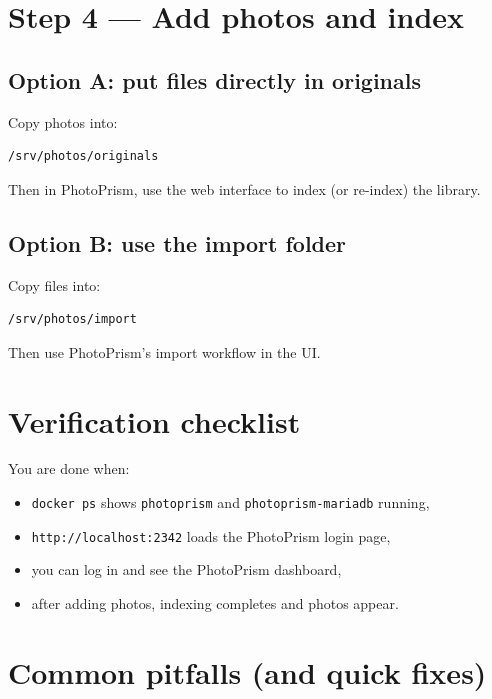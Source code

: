 
\section{Step 4 --- Add photos and index}
\subsection{Option A: put files directly in originals}
Copy photos into:
\begin{lstlisting}
/srv/photos/originals
\end{lstlisting}

Then in PhotoPrism, use the web interface to index (or re-index) the library.

\subsection{Option B: use the import folder}
Copy files into:
\begin{lstlisting}
/srv/photos/import
\end{lstlisting}

Then use PhotoPrism’s import workflow in the UI.

\section{Verification checklist}
You are done when:
\begin{itemize}[leftmargin=*]
  \item \texttt{docker ps} shows \texttt{photoprism} and \texttt{photoprism-mariadb} running,
  \item \texttt{http://localhost:2342} loads the PhotoPrism login page,
  \item you can log in and see the PhotoPrism dashboard,
  \item after adding photos, indexing completes and photos appear.
\end{itemize}

\section{Common pitfalls (and quick fixes)}

